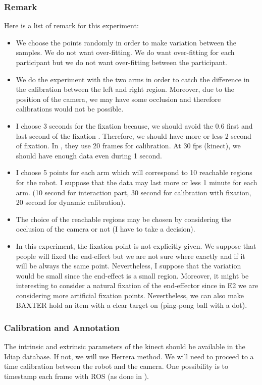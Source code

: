 \documentclass[11pt,a4paper]{article}
\begin{document}
\subsubsection{Remark}
Here is a list of remark for this experiment:
\begin{itemize}
\item We choose the points randomly in order to make variation between the samples. We do not want over-fitting. We do want over-fitting for each participant but we do not want over-fitting between the participant.
\item We do the experiment with the two arms in order to catch the difference in the calibration between the left and right region. Moreover, due to the position of the camera, we may have some occlusion and therefore calibrations would not be possible.
\item I choose 3 seconds for the fixation because, we should avoid the 0.6 first and last second of the fixation \cite{Land2009}. Therefore, we should have more or less 2 second of fixation. In \cite{Siegfried2017}, they use 20 frames for calibration. At 30 fps (kinect), we should have enough data even during 1 second.
\item I choose 5 points for each arm which will correspond to 10 reachable regions for the robot. I suppose that the data may last more or less 1 minute for each arm. (10 second for interaction part, 30 second for calibration with fixation, 20 second for dynamic calibration).
\item The choice of the reachable regions may be chosen by considering the occlusion of the camera or not (I have to take a decision).
\item In this experiment, the fixation point is not explicitly given. We suppose that people will fixed the end-effect but we are not sure where exactly and if it will be always the same point. Nevertheless, I suppose that the variation would be small since the end-effect is a small region. Moreover, it might be interesting to consider a natural fixation of the end-effector since in E2 we are considering more artificial fixation points. Nevertheless, we can also make BAXTER hold an item with a clear target on (ping-pong ball with a dot).
\end{itemize}

\subsubsection{Calibration and Annotation}
The intrinsic and extrinsic parameters of the kinect should be available in the Idiap database. If not, we will use Herrera method. We will need to proceed to a time calibration between the robot and the camera. One possibility is to timestamp each frame with ROS (as done in \cite{Azagra2017}).
\end{document}
